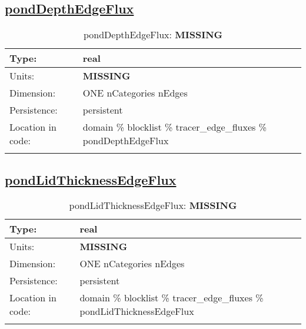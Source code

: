 \subsection[pondDepthEdgeFlux]{\hyperref[sec:var_tab_tracer_edge_fluxes]{pondDepthEdgeFlux}}
\label{subsec:var_sec_tracer_edge_fluxes_pondDepthEdgeFlux}
\begin{center}
\begin{longtable}{| p{2.0in} | p{4.0in} |}
        \hline 
        Type: & real \\
        \hline 
        Units: & {\bf \color{red} MISSING} \\
        \hline 
        Dimension: & ONE nCategories nEdges \\
        \hline 
        Persistence: & persistent \\
        \hline 
         Location in code: & domain \% blocklist \% tracer\_edge\_fluxes \% pondDepthEdgeFlux \\
         \hline 
    \caption{pondDepthEdgeFlux: {\bf \color{red} MISSING}}
\end{longtable}
\end{center}
\subsection[pondLidThicknessEdgeFlux]{\hyperref[sec:var_tab_tracer_edge_fluxes]{pondLidThicknessEdgeFlux}}
\label{subsec:var_sec_tracer_edge_fluxes_pondLidThicknessEdgeFlux}
\begin{center}
\begin{longtable}{| p{2.0in} | p{4.0in} |}
        \hline 
        Type: & real \\
        \hline 
        Units: & {\bf \color{red} MISSING} \\
        \hline 
        Dimension: & ONE nCategories nEdges \\
        \hline 
        Persistence: & persistent \\
        \hline 
         Location in code: & domain \% blocklist \% tracer\_edge\_fluxes \% pondLidThicknessEdgeFlux \\
         \hline 
    \caption{pondLidThicknessEdgeFlux: {\bf \color{red} MISSING}}
\end{longtable}
\end{center}
